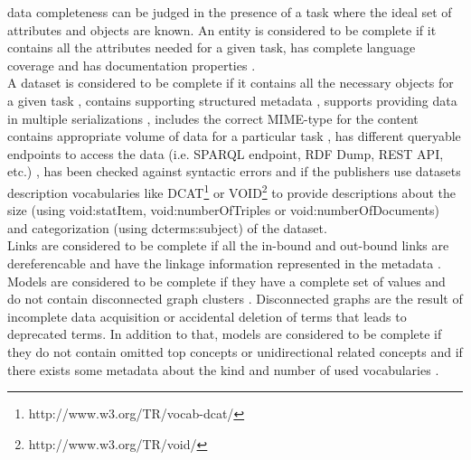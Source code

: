 \documentclass[onecolumn, crcready]{iosart2c}
\begin{document}
data completeness can be judged in the presence of a task where the ideal set of attributes and objects are known. An entity is considered to be complete if it contains all the attributes needed for a given task, has complete language coverage \cite{Mader2012} and has documentation properties \cite{w3c_skos_rec}\cite{Mader2012}.\\ A dataset is considered to be complete if it contains all the necessary objects for a given task \cite{Mendes2012}, contains supporting structured metadata \cite{Hogan2010}, supports providing data in multiple serializations \cite{Framework2012}, includes the correct MIME-type for the content \cite{Hogan2010} contains appropriate volume of data for a particular task \cite{Framework2012}, has different queryable endpoints to access the data (i.e. SPARQL endpoint, RDF Dump, REST API, etc.) \cite{Framework2012}, has been checked against syntactic errors \cite{Hogan2010} and if the publishers use datasets description vocabularies like DCAT\footnote{http://www.w3.org/TR/vocab-dcat/} or VOID\footnote{http://www.w3.org/TR/void/} to provide descriptions about the size (using void:statItem, void:numberOfTriples or void:numberOfDocuments) and categorization (using dcterms:subject) of the dataset.\\ Links are considered to be complete if all the in-bound and out-bound links are dereferencable \cite{Hogan2010}\cite{Mader2012}\cite{Gueret2012} and have the linkage information represented in the metadata \cite{Hogan2010}.\\ Models are considered to be complete if they have a complete set of values \cite{Mader2012} and do not contain disconnected graph clusters \cite{Mader2012}. Disconnected graphs are the result of incomplete data acquisition or accidental deletion of terms that leads to deprecated terms. In addition to that, models are considered to be complete if they do not contain omitted top concepts or unidirectional related concepts \cite{Hogan2010} and if there exists some metadata about the kind and number of used vocabularies \cite{Framework2012}.
\end{document}
